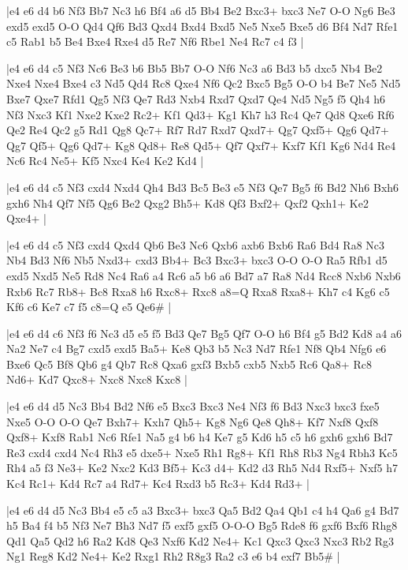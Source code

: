 \whitename{}
\blackname{}
\makegametitle
|e4 e6 d4 b6 Nf3 Bb7 Nc3 h6 Bf4 a6 d5 Bb4 Be2 Bxc3+ bxc3 Ne7 O-O Ng6 Be3 exd5 exd5 O-O Qd4 Qf6 Bd3 Qxd4 Bxd4 Bxd5 Ne5 Nxe5 Bxe5 d6 Bf4 Nd7 Rfe1 c5 Rab1 b5 Be4 Bxe4 Rxe4 d5 Re7 Nf6 Rbe1 Ne4 Rc7 c4 f3  |

\whitename{}
\blackname{}
\makegametitle
|e4 e6 d4 c5 Nf3 Nc6 Be3 b6 Bb5 Bb7 O-O Nf6 Nc3 a6 Bd3 b5 dxc5 Nb4 Be2 Nxe4 Nxe4 Bxe4 c3 Nd5 Qd4 Rc8 Qxe4 Nf6 Qc2 Bxc5 Bg5 O-O b4 Be7 Ne5 Nd5 Bxe7 Qxe7 Rfd1 Qg5 Nf3 Qe7 Rd3 Nxb4 Rxd7 Qxd7 Qe4 Nd5 Ng5 f5 Qh4 h6 Nf3 Nxc3 Kf1 Nxe2 Kxe2 Rc2+ Kf1 Qd3+ Kg1 Kh7 h3 Rc4 Qe7 Qd8 Qxe6 Rf6 Qe2 Re4 Qc2 g5 Rd1 Qg8 Qc7+ Rf7 Rd7 Rxd7 Qxd7+ Qg7 Qxf5+ Qg6 Qd7+ Qg7 Qf5+ Qg6 Qd7+ Kg8 Qd8+ Re8 Qd5+ Qf7 Qxf7+ Kxf7 Kf1 Kg6 Nd4 Re4 Nc6 Rc4 Ne5+ Kf5 Nxc4 Ke4 Ke2 Kd4  |

\whitename{}
\blackname{}
\makegametitle
|e4 e6 d4 c5 Nf3 cxd4 Nxd4 Qh4 Bd3 Bc5 Be3 e5 Nf3 Qe7 Bg5 f6 Bd2 Nh6 Bxh6 gxh6 Nh4 Qf7 Nf5 Qg6 Be2 Qxg2 Bh5+ Kd8 Qf3 Bxf2+ Qxf2 Qxh1+ Ke2 Qxe4+  |

\whitename{}
\blackname{}
\makegametitle
|e4 e6 d4 c5 Nf3 cxd4 Qxd4 Qb6 Be3 Nc6 Qxb6 axb6 Bxb6 Ra6 Bd4 Ra8 Nc3 Nb4 Bd3 Nf6 Nb5 Nxd3+ cxd3 Bb4+ Bc3 Bxc3+ bxc3 O-O O-O Ra5 Rfb1 d5 exd5 Nxd5 Ne5 Rd8 Nc4 Ra6 a4 Rc6 a5 b6 a6 Bd7 a7 Ra8 Nd4 Rcc8 Nxb6 Nxb6 Rxb6 Rc7 Rb8+ Bc8 Rxa8 h6 Rxc8+ Rxc8 a8=Q Rxa8 Rxa8+ Kh7 c4 Kg6 c5 Kf6 c6 Ke7 c7 f5 c8=Q e5 Qe6\#  |

\whitename{}
\blackname{}
\makegametitle
|e4 e6 d4 c6 Nf3 f6 Nc3 d5 e5 f5 Bd3 Qe7 Bg5 Qf7 O-O h6 Bf4 g5 Bd2 Kd8 a4 a6 Na2 Ne7 c4 Bg7 cxd5 exd5 Ba5+ Ke8 Qb3 b5 Nc3 Nd7 Rfe1 Nf8 Qb4 Nfg6 e6 Bxe6 Qc5 Bf8 Qb6 g4 Qb7 Rc8 Qxa6 gxf3 Bxb5 cxb5 Nxb5 Rc6 Qa8+ Rc8 Nd6+ Kd7 Qxc8+ Nxc8 Nxc8 Kxc8  |

\whitename{}
\blackname{}
\makegametitle
|e4 e6 d4 d5 Nc3 Bb4 Bd2 Nf6 e5 Bxc3 Bxc3 Ne4 Nf3 f6 Bd3 Nxc3 bxc3 fxe5 Nxe5 O-O O-O Qe7 Bxh7+ Kxh7 Qh5+ Kg8 Ng6 Qe8 Qh8+ Kf7 Nxf8 Qxf8 Qxf8+ Kxf8 Rab1 Nc6 Rfe1 Na5 g4 b6 h4 Ke7 g5 Kd6 h5 c5 h6 gxh6 gxh6 Bd7 Re3 cxd4 cxd4 Nc4 Rh3 e5 dxe5+ Nxe5 Rh1 Rg8+ Kf1 Rh8 Rb3 Ng4 Rbh3 Kc5 Rh4 a5 f3 Ne3+ Ke2 Nxc2 Kd3 Bf5+ Kc3 d4+ Kd2 d3 Rh5 Nd4 Rxf5+ Nxf5 h7 Kc4 Rc1+ Kd4 Rc7 a4 Rd7+ Kc4 Rxd3 b5 Rc3+ Kd4 Rd3+  |

\whitename{}
\blackname{}
\makegametitle
|e4 e6 d4 d5 Nc3 Bb4 e5 c5 a3 Bxc3+ bxc3 Qa5 Bd2 Qa4 Qb1 c4 h4 Qa6 g4 Bd7 h5 Ba4 f4 b5 Nf3 Ne7 Bh3 Nd7 f5 exf5 gxf5 O-O-O Bg5 Rde8 f6 gxf6 Bxf6 Rhg8 Qd1 Qa5 Qd2 h6 Ra2 Kd8 Qe3 Nxf6 Kd2 Ne4+ Kc1 Qxc3 Qxc3 Nxc3 Rb2 Rg3 Ng1 Reg8 Kd2 Ne4+ Ke2 Rxg1 Rh2 R8g3 Ra2 c3 e6 b4 exf7 Bb5\#  |

